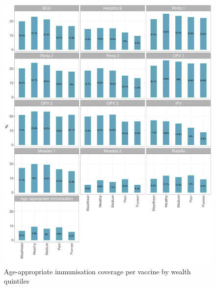 \documentclass[12pt,a4paper]{article}
\begin{document}
\begin{figure}[H]

{\centering \includegraphics{kayinReport_files/figure-latex/epi4aPlot-1} 

}

\caption{Age-appropriate immunisation coverage per vaccine by wealth quintiles}\label{fig:epi4aPlot}
\end{figure}
\end{document}
